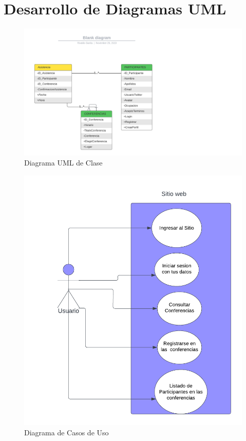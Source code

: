 \chapter{Desarrollo de Diagramas UML}

\begin{figure}[H]
	\centering
	\includegraphics[width=1\linewidth]{Imagenes/Diagramas/UML}
	\caption{Diagrama UML de Clase}
	\label{fig:uml}
\end{figure}

\begin{figure}[H]
	\centering
	\includegraphics[width=0.9\linewidth]{Imagenes/Diagramas/Casos de uso}
	\caption{Diagrama de Casos de Uso}
	\label{fig:casos-de-uso}
\end{figure}


